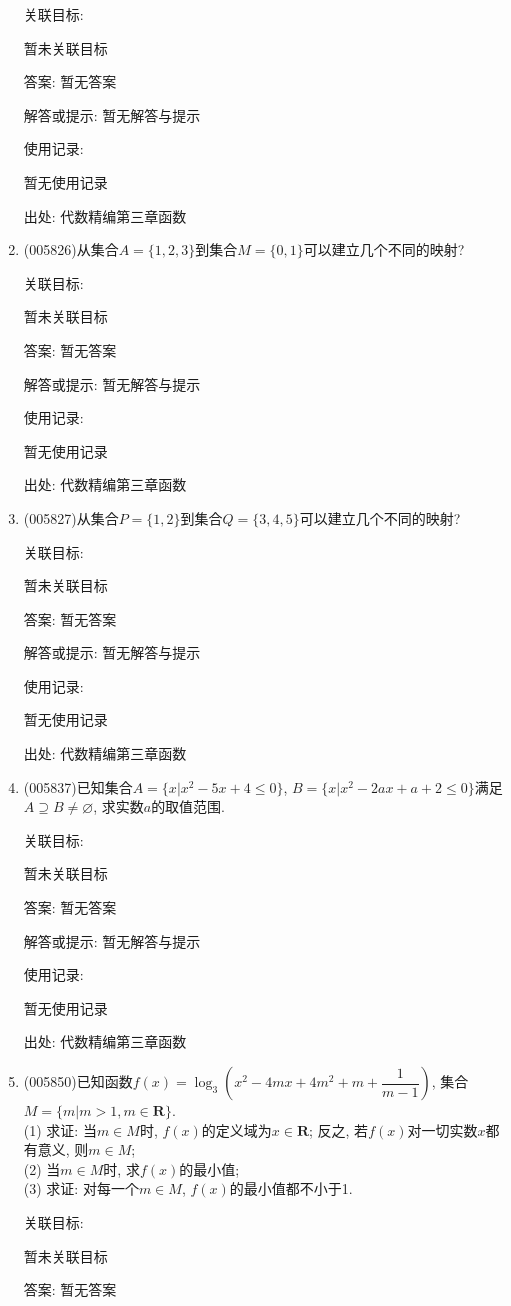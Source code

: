 \documentclass[10pt,a4paper]{article}
\begin{document}
\begin{enumerate}[1.]
关联目标:

暂未关联目标

答案: 暂无答案

解答或提示: 暂无解答与提示

使用记录:

暂无使用记录


出处: 代数精编第三章函数
\item { (005826)}从集合$A=\{1,2,3\}$到集合$M=\{0,1\}$可以建立几个不同的映射?


关联目标:

暂未关联目标

答案: 暂无答案

解答或提示: 暂无解答与提示

使用记录:

暂无使用记录


出处: 代数精编第三章函数
\item { (005827)}从集合$P=\{1,2\}$到集合$Q=\{3,4,5\}$可以建立几个不同的映射?


关联目标:

暂未关联目标

答案: 暂无答案

解答或提示: 暂无解答与提示

使用记录:

暂无使用记录


出处: 代数精编第三章函数
\item { (005837)}已知集合$A=\{x|x^2-5x+4\le 0\}$, $B=\{x|x^2-2ax+a+2\le 0\}$满足$A\supseteq B\ne \varnothing$, 求实数$a$的取值范围.


关联目标:

暂未关联目标

答案: 暂无答案

解答或提示: 暂无解答与提示

使用记录:

暂无使用记录


出处: 代数精编第三章函数
\item { (005850)}已知函数$f(x)=\log_3(x^2-4mx+4m^2+m+\dfrac 1{m-1})$, 集合$M=\{m|m>1,m\in \mathbf{R}\}$.\\
(1) 求证: 当$m\in M$时, $f(x)$的定义域为$x\in \mathbf{R}$; 反之, 若$f(x)$对一切实数$x$都有意义, 则$m\in M$;\\
(2) 当$m\in M$时, 求$f(x)$的最小值;\\
(3) 求证: 对每一个$m\in M$, $f(x)$的最小值都不小于1.


关联目标:

暂未关联目标

答案: 暂无答案


\end{enumerate}
\end{document}
